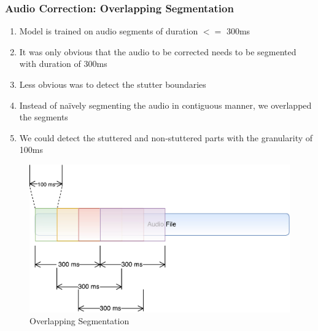 \documentclass{beamer}
\begin{document}
\begin{frame}[allowframebreaks]
\frametitle{Audio Correction: Overlapping Segmentation}
\begin{enumerate}
 \item Model is trained on audio segments of duration $<=$ 300ms
 \item It was only obvious that the audio to be corrected needs to be segmented with duration of 300ms
 \item Less obvious was to detect the stutter boundaries
 \item Instead of na\"ively segmenting the audio in contiguous manner, we overlapped the segments
 \item We could detect the stuttered and non-stuttered parts with the granularity of 100ms
\end{enumerate}

\begin{figure}[ht]
    \centering
    \includegraphics[scale=0.7]{OverlappingSplits300ms.pdf}
    \caption{Overlapping Segmentation}
    \label{fig:overlappingSegmentation}
\end{figure}
\end{frame}
\end{document}
